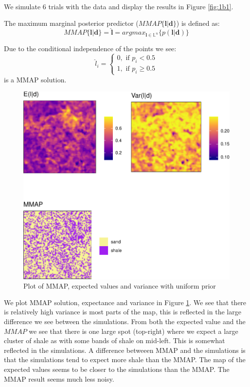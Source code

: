 \documentclass[]{article}
\newcommand{\vect}[1]{\ensuremath{\boldsymbol{\mathbf{#1}}}}
\begin{document}
We simulate 6 trials with the data and display the results in Figure
\ref{fig:1b1}.

The maximum marginal posterior predictor
(\(MMAP\lbrace \vect l | \vect d \rbrace\)) is defined as:
\begin{equation} \label{eq:mmap}
MMAP\lbrace \vect l | \vect d \rbrace = \vect{\hat l} = argmax_{\vect l \in \mathbb{L}^n}\lbrace p(\vect l | \vect d)\rbrace
\end{equation}

Due to the conditional independence of the points we see:
\begin{equation}
\hat l_i = \begin{cases}
0, \text{ if } p_i < 0.5 \\
1, \text{ if } p_i \geq 0.5
\end{cases}
\end{equation} is a MMAP solution.

\begin{figure}
\centering
\includegraphics{Exercise-3_files/figure-latex/fig1b3-1.pdf}
\caption{\label{fig:1b3} Plot of MMAP, expected values and variance with
uniform prior}
\end{figure}

We plot MMAP solution, expectance and variance in Figure \ref{fig:1b3}.
We see that there is relatively high variance is most parts of the map,
this is reflected in the large difference we see between the
simulations. From both the expected value and the \(MMAP\) we see that
there is one large spot (top-right) where we expect a large cluster of
shale as with some bands of shale on mid-left. This is somewhat
reflected in the simulations. A difference betweeen MMAP and the
simulations is that the simulations tend to expect more shale than the
MMAP. The map of the expected values seems to be closer to the
simulations than the MMAP. The MMAP result seems much less noisy.
\end{document}

